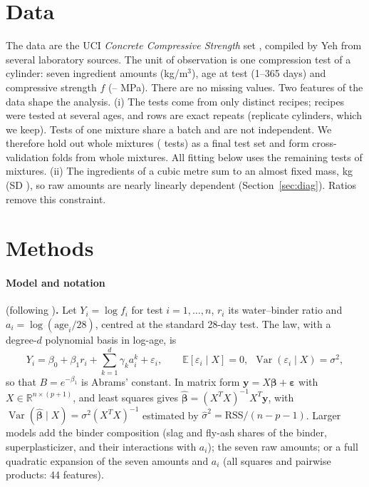 \documentclass[11pt]{article}
\newcommand{\wb}{r}
\begin{document}
\section{Data}
The data are the UCI \emph{Concrete Compressive Strength} set \citep{yeh1998,ucidata}, compiled by Yeh from several laboratory sources. The unit of observation is one compression test of a cylinder: seven ingredient amounts (kg/m$^3$), age at test (1--365 days) and compressive strength $f$ (\StrMin--\StrMax{} MPa). There are no missing values. Two features of the data shape the analysis. (i) The \NObs{} tests come from only \NMix{} distinct recipes; \NMultiAge{} recipes were tested at several ages, and \NDup{} rows are exact repeats (replicate cylinders, which we keep). Tests of one mixture share a batch and are not independent. We therefore hold out \NMixTest{} whole mixtures (\NTest{} tests) as a final test set and form cross-validation folds from whole mixtures. All fitting below uses the remaining \NTrain{} tests of \NMixTrain{} mixtures. (ii) The ingredients of a cubic metre sum to an almost fixed mass, \MixTotal{} kg (SD \MixTotalSD), so raw amounts are nearly linearly dependent (Section~\ref{sec:diag}). Ratios remove this constraint.

\section{Methods}
\paragraph{Model and notation} (following \citealp{maddu2026})\textbf{.} Let $Y_i=\log f_i$ for test $i=1,\dots,n$, $\wb_i$ its water--binder ratio and $a_i=\log(\text{age}_i/28)$, centred at the standard 28-day test. The law, with a degree-$d$ polynomial basis in log-age, is
\begin{equation}
Y_i=\beta_0+\beta_1\wb_i+\textstyle\sum_{k=1}^{d}\gamma_k a_i^{k}+\varepsilon_i,\qquad \mathbb{E}[\varepsilon_i\mid X]=0,\ \ \operatorname{Var}(\varepsilon_i\mid X)=\sigma^2,
\label{eq:law}
\end{equation}
so that $B=e^{-\beta_1}$ is Abrams' constant. In matrix form $\mathbf y=X\bm\beta+\bm\varepsilon$ with $X\in\mathbb R^{n\times(p+1)}$, and least squares gives $\hat{\bm\beta}=(X^TX)^{-1}X^T\mathbf y$, with $\operatorname{Var}(\hat{\bm\beta}\mid X)=\sigma^2(X^TX)^{-1}$ estimated by $\hat\sigma^2=\mathrm{RSS}/(n-p-1)$. Larger models add the binder composition (slag and fly-ash shares of the binder, superplasticizer, and their interactions with $a_i$); the seven raw amounts; or a full quadratic expansion of the seven amounts and $a_i$ (all squares and pairwise products: 44 features).
\end{document}
